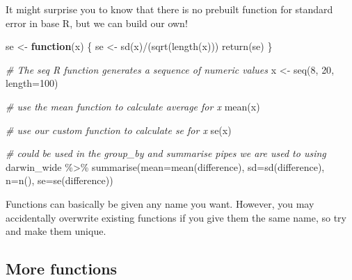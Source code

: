 \documentclass[
]{book}
\makeatletter
\newenvironment{Shaded}{\begin{snugshade}}{\end{snugshade}}
\newcommand{\AttributeTok}[1]{\textcolor[rgb]{0.77,0.63,0.00}{#1}}
\newcommand{\CommentTok}[1]{\textcolor[rgb]{0.56,0.35,0.01}{\textit{#1}}}
\newcommand{\ControlFlowTok}[1]{\textcolor[rgb]{0.13,0.29,0.53}{\textbf{#1}}}
\newcommand{\DecValTok}[1]{\textcolor[rgb]{0.00,0.00,0.81}{#1}}
\newcommand{\FunctionTok}[1]{\textcolor[rgb]{0.00,0.00,0.00}{#1}}
\newcommand{\NormalTok}[1]{#1}
\newcommand{\OtherTok}[1]{\textcolor[rgb]{0.56,0.35,0.01}{#1}}
\newcommand{\SpecialCharTok}[1]{\textcolor[rgb]{0.00,0.00,0.00}{#1}}
\newenvironment{kframe}{%
\medskip{}
\setlength{\fboxsep}{.8em}
 \def\at@end@of@kframe{}%
 \ifinner\ifhmode%
  \def\at@end@of@kframe{\end{minipage}}%
  \begin{minipage}{\columnwidth}%
 \fi\fi%
 \def\FrameCommand##1{\hskip\@totalleftmargin \hskip-\fboxsep
 \colorbox{shadecolor}{##1}\hskip-\fboxsep
     \hskip-\linewidth \hskip-\@totalleftmargin \hskip\columnwidth}%
 \MakeFramed {\advance\hsize-\width
   \@totalleftmargin\z@ \linewidth\hsize
   \@setminipage}}%
 {\par\unskip\endMakeFramed%
 \at@end@of@kframe}
\newenvironment{block}[1]
  {
  \begin{itemize}
  \renewcommand{\labelitemi}{
    \raisebox{-.7\height}[0pt][0pt]{
      {\setkeys{Gin}{width=3em,keepaspectratio}\texttt{[image: images/\#1]}}
    }
  }
  \setlength{\fboxsep}{1em}
  \begin{kframe}
  \item
  }
  {
  \end{kframe}
  \end{itemize}
  }
\newenvironment{rmdwarning}
  {\begin{block}{warning}}
  {\end{block}}
\makeatother
\begin{document}
It might surprise you to know that there is no prebuilt function for standard error in base R, but we can build our own!

\begin{Shaded}
\begin{Highlighting}[]
\NormalTok{se }\OtherTok{\textless{}{-}} \ControlFlowTok{function}\NormalTok{(x) \{}
\NormalTok{  se }\OtherTok{\textless{}{-}} \FunctionTok{sd}\NormalTok{(x)}\SpecialCharTok{/}\NormalTok{(}\FunctionTok{sqrt}\NormalTok{(}\FunctionTok{length}\NormalTok{(x)))}
  \FunctionTok{return}\NormalTok{(se)}
\NormalTok{  \}}
\end{Highlighting}
\end{Shaded}

\begin{Shaded}
\begin{Highlighting}[]
\CommentTok{\# The seq R function generates a sequence of numeric values}
\NormalTok{x }\OtherTok{\textless{}{-}} \FunctionTok{seq}\NormalTok{(}\DecValTok{8}\NormalTok{, }\DecValTok{20}\NormalTok{, }\AttributeTok{length=}\DecValTok{100}\NormalTok{)}

\CommentTok{\# use the mean function to calculate average for x}
\FunctionTok{mean}\NormalTok{(x)}

\CommentTok{\# use our custom function to calculate se for x}
\FunctionTok{se}\NormalTok{(x)}

\CommentTok{\# could be used in the group\_by and summarise pipes we are used to using}
\NormalTok{darwin\_wide }\SpecialCharTok{\%\textgreater{}\%} 
  \FunctionTok{summarise}\NormalTok{(}\AttributeTok{mean=}\FunctionTok{mean}\NormalTok{(difference),}
            \AttributeTok{sd=}\FunctionTok{sd}\NormalTok{(difference),}
            \AttributeTok{n=}\FunctionTok{n}\NormalTok{(),}
            \AttributeTok{se=}\FunctionTok{se}\NormalTok{(difference))}
\end{Highlighting}
\end{Shaded}

\begin{rmdwarning}
Functions can basically be given any name you want. However, you may
accidentally overwrite existing functions if you give them the same
name, so try and make them unique.
\end{rmdwarning}

\hypertarget{more-functions}{%
\subsection{More functions}\label{more-functions}}
\end{document}
